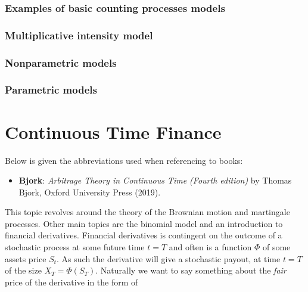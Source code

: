 \documentclass[a4paper,12pt,openany]{book}
\providecommand{\tightlist}{%
 \setlength{\itemsep}{0pt}\setlength{\parskip}{0pt}}
\begin{document}
\hypertarget{examples-of-basic-counting-processes-models}{%
\subsection{Examples of basic counting processes models}\label{examples-of-basic-counting-processes-models}}

\hypertarget{multiplicative-intensity-model}{%
\subsection{Multiplicative intensity model}\label{multiplicative-intensity-model}}

\hypertarget{nonparametric-models}{%
\subsection{Nonparametric models}\label{nonparametric-models}}

\hypertarget{parametric-models}{%
\subsection{Parametric models}\label{parametric-models}}

\hypertarget{continuous-time-finance}{%
\chapter{Continuous Time Finance}\label{continuous-time-finance}}

Below is given the abbreviations used when referencing to books:

\begin{itemize}
\tightlist
\item
  \textbf{Bjork}: \emph{Arbitrage Theory in Continuous Time (Fourth edition)} by Thomas Bjork, Oxford University Press (2019).\cite{bjork2009}
\end{itemize}

This topic revolves around the theory of the Brownian motion and martingale processes. Other main topics are the binomial model and an introduction to financial derivatives. Financial derivatives is contingent on the outcome of a stochastic process at some future time \(t=T\) and often is a function \(\Phi\) of some assets price \(S_t\). As such the derivative will give a stochastic payout, at time \(t=T\) of the size \(X_T=\Phi(S_T)\). Naturally we want to say something about the \emph{fair} price of the derivative in the form of
\end{document}

